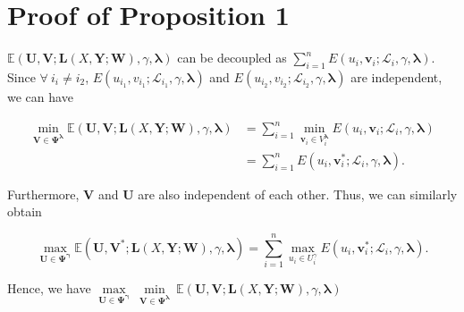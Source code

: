 \documentclass[journal]{IEEEtran}
\begin{document}
{\section{Proof of Proposition 1}
\label{sec:p1}
$ \mathbb{E}(\mathbf{U},\mathbf{V}; \mathbf{L}(X, \mathbf{Y}; \mathbf{W}),\gamma,{\bm \lambda}) $ can be decoupled as $\sum^n_{i=1} E(u_i,\mathbf{v}_i;\mathcal{L}_i,\gamma, {\bm \lambda})$.
		Since $\forall \ i_i \neq i_2$, $E(u_{i_1},v_{i_1};\mathcal{L}_{i_1},\gamma,{\bm \lambda})$ and $E(u_{i_2},v_{i_2};\mathcal{L}_{i_2},\gamma,{\bm \lambda})$ are independent, we can have   
		\begin{small}
			\begin{displaymath}
			\begin{aligned}
			\min_{\mathbf{V}\in\mathbf{\Psi}^{\bm \lambda}}\mathbb{E}(\mathbf{U},\mathbf{V};\mathbf{L}(X, \mathbf{Y}; \mathbf{W}),\gamma,{\bm \lambda}) &= \sum^n_{i=1} \min_{\mathbf{v}_i\in V^{\bm \lambda}_i} E(u_i,\mathbf{v}_i;\mathcal{L}_i,\gamma,{\bm \lambda}) 
			\\ &= \sum^n_{i=1}  E(u_i,\mathbf{v}^\ast_i;\mathcal{L}_i,\gamma,{\bm \lambda}).
			\end{aligned}
			\end{displaymath}
		\end{small}Furthermore, $\mathbf{V}$ and $\mathbf{U}$ are also independent of each other. Thus, we can similarly obtain
		\begin{small}
			\begin{displaymath}
			\max_{\mathbf{U}\in\mathbf{\Psi}^{\bm \gamma}}\mathbb{E}(\mathbf{U},\mathbf{V}^\ast;\mathbf{L}(X, \mathbf{Y}; \mathbf{W}),\gamma,{\bm \lambda}) = \sum^n_{i=1} \max_{u_i\in U^{\gamma}_i} E(u_i,\mathbf{v}^\ast_i;\mathcal{L}_i,\gamma,{\bm \lambda}).
			\end{displaymath}
		\end{small}
		Hence, we have $\underset{\mathbf{U}\in\mathbf{\Psi}^{\bm \gamma}}{\max} \ \underset{\mathbf{V}\in\mathbf{\Psi}^{\bm \lambda}}{\min} \ \mathbb{E}(\mathbf{U},\mathbf{V};\mathbf{L}(X, \mathbf{Y}; \mathbf{W}),\gamma,{\bm \lambda})$
		\begin{small}
			\begin{displaymath}

\end{displaymath}
\end{small}}
\end{document}
